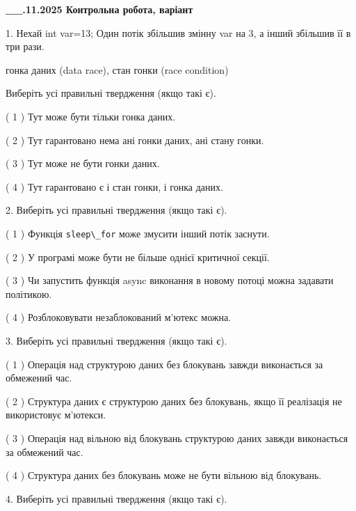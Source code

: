 \documentclass[12pt, ukrainian]{article}
\def\code#1{\Verb!#1!}
\begin{document}
\newpage
\begin {large}

\textbf{\_\_.11.2025 Контрольна робота, варіант  }\par


{
1. Нехай int var=13; Один потік збільшив змінну var на 3, а інший збільшив її в три рази.

гонка даних (data race), стан гонки (race condition)

Виберіть усі правильні твердження (якщо такі є).\par
\vspace{2mm}
( 1 ) Тут може бути тільки гонка даних.%

( 2 ) Тут гарантовано нема ані гонки даних, ані стану гонки.%

( 3 ) Тут може не бути гонки даних.%

( 4 ) Тут гарантовано є і стан гонки, і гонка даних.%


2. Виберіть усі правильні твердження (якщо такі є).\par
\vspace{2mm}

( 1 ) Функція \code{sleep\_for} може змусити інший потік заснути.%

( 2 ) У програмі може бути не більше однієї критичної секції.%

( 3 ) Чи запустить функція  async виконання в новому потоці можна задавати політикою.%

( 4 ) Розблоковувати незаблокований м’ютекс можна.%


3. Виберіть усі правильні твердження (якщо такі є).\par
\vspace{2mm}

( 1 ) Операція над структурою даних без блокувань завжди виконається за обмежений час.%

( 2 ) Структура даних є структурою даних без блокувань, якщо її реалізація не використовує м’ютекси.%

( 3 ) Операція над вільною від блокувань структурою даних завжди виконається за обмежений час.%

( 4 ) Структура даних без блокувань може не бути вільною від блокувань.%


4. Виберіть усі правильні твердження (якщо такі є).\par
\vspace{2mm}

}
\end{large}
\end{document}
